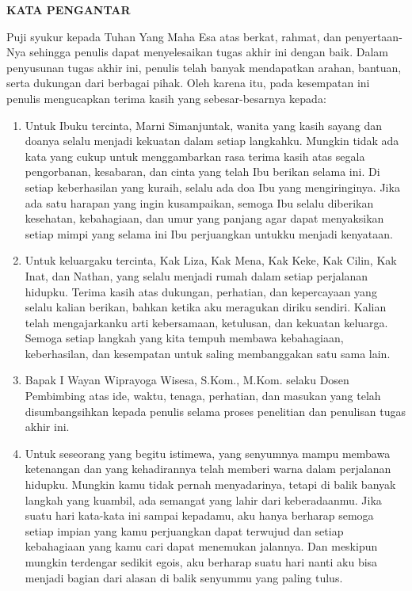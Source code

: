\clearpage
{}%

\begin{justifying}
	\large \bfseries \centering \MakeUppercase{Kata Pengantar}\linebreak

	\normalsize \normalfont \justifying
	Puji syukur kepada Tuhan Yang Maha Esa atas berkat, rahmat, dan penyertaan-Nya sehingga penulis dapat menyelesaikan tugas akhir ini dengan baik. Dalam penyusunan tugas akhir ini, penulis telah banyak mendapatkan arahan, bantuan, serta dukungan dari berbagai pihak. Oleh karena itu, pada kesempatan ini penulis mengucapkan terima kasih yang sebesar-besarnya kepada: \par
	\begin{enumerate}
		\item Untuk Ibuku tercinta, Marni Simanjuntak, wanita yang kasih sayang dan doanya selalu menjadi kekuatan dalam setiap langkahku. Mungkin tidak ada kata yang cukup untuk menggambarkan rasa terima kasih atas segala pengorbanan, kesabaran, dan cinta yang telah Ibu berikan selama ini. Di setiap keberhasilan yang kuraih, selalu ada doa Ibu yang mengiringinya. Jika ada satu harapan yang ingin kusampaikan, semoga Ibu selalu diberikan kesehatan, kebahagiaan, dan umur yang panjang agar dapat menyaksikan setiap mimpi yang selama ini Ibu perjuangkan untukku menjadi kenyataan.
		\item Untuk keluargaku tercinta, Kak Liza, Kak Mena, Kak Keke, Kak Cilin, Kak Inat, dan Nathan, yang selalu menjadi rumah dalam setiap perjalanan hidupku. Terima kasih atas dukungan, perhatian, dan kepercayaan yang selalu kalian berikan, bahkan ketika aku meragukan diriku sendiri. Kalian telah mengajarkanku arti kebersamaan, ketulusan, dan kekuatan keluarga. Semoga setiap langkah yang kita tempuh membawa kebahagiaan, keberhasilan, dan kesempatan untuk saling membanggakan satu sama lain.
		\item Bapak I Wayan Wiprayoga Wisesa, S.Kom., M.Kom. selaku Dosen Pembimbing atas ide, waktu, tenaga, perhatian, dan masukan yang telah disumbangsihkan kepada penulis selama proses penelitian dan penulisan tugas akhir ini.
		\item Untuk seseorang yang begitu istimewa, yang senyumnya mampu membawa ketenangan dan yang kehadirannya telah memberi warna dalam perjalanan hidupku. Mungkin kamu tidak pernah menyadarinya, tetapi di balik banyak langkah yang kuambil, ada semangat yang lahir dari keberadaanmu. Jika suatu hari kata-kata ini sampai kepadamu, aku hanya berharap semoga setiap impian yang kamu perjuangkan dapat terwujud dan setiap kebahagiaan yang kamu cari dapat menemukan jalannya. Dan meskipun mungkin terdengar sedikit egois, aku berharap suatu hari nanti aku bisa menjadi bagian dari alasan di balik senyummu yang paling tulus.

\end{enumerate}
\end{justifying}
